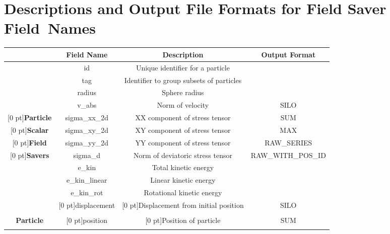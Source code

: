\section{Descriptions and Output File Formats for Field Saver Field~Names}\label{table:file_formats}
\begin{table}[h]
\begin{center}
\vspace{-2 mm}
\begin{tabular}{|c|c|c|c|} \cline{2-4} 
  \multicolumn{1}{c|}{} & \textbf{Field Name} & \textbf{Description} & \textbf{Output Format}\\
  \hline
  & id & Unique identifier for a particle & \\\cline{2-3}
  & tag & Identifier to group subsets of particles & \\\cline{2-3}
  & radius & Sphere radius & \\\cline{2-3}
  & v\_abs & Norm of velocity & \footnotesize{SILO}\\\cline{2-3}
  \raisebox{1.25 ex}[0 pt]{\textbf{Particle}} & sigma\_xx\_2d & XX component of stress tensor & \footnotesize{SUM}\\\cline{2-3}
  \raisebox{1.25 ex}[0 pt]{\textbf{Scalar}} & sigma\_xy\_2d & XY component of stress tensor & \footnotesize{MAX}\\\cline{2-3}
  \raisebox{1.25 ex}[0 pt]{\textbf{Field}} & sigma\_yy\_2d & YY component of stress tensor & \footnotesize{RAW\_SERIES}\\\cline{2-3}
  \raisebox{1.25 ex}[0 pt]{\textbf{Savers}} & sigma\_d & Norm of deviatoric stress tensor & \footnotesize{RAW\_WITH\_POS\_ID}\\\cline{2-3}
  & e\_kin & Total kinetic energy & \\\cline{2-3}
  & e\_kin\_linear & Linear kinetic energy & \\\cline{2-3}
  & e\_kin\_rot & Rotational kinetic energy & \\\cline{2-3}
  \hline 
  & \raisebox{-0.5 ex}[0 pt]{displacement} & \raisebox{-0.5 ex}[0 pt]{Displacement from initial position} & \footnotesize{SILO} \\[0.75 ex]\cline{2-3}\\[-3.5 ex]
  \textbf{Particle} & \raisebox{-1.25 ex}[0 pt]{position} & \raisebox{-1.25 ex}[0 pt]{Position of particle} & \footnotesize{SUM} \\[1.5 ex]\cline{2-3}\\[-4.25 ex]

\end{tabular}
\end{center}
\end{table}
